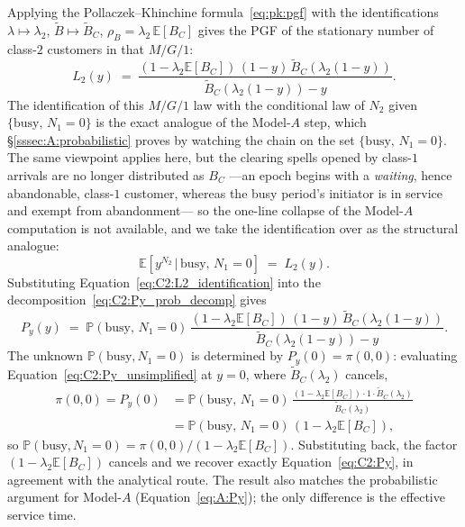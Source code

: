 Applying the Pollaczek--Khinchine formula~\eqref{eq:pk:pgf} with the identifications $\lambda\mapsto\lambda_2$, $\widetilde{B}\mapsto\widetilde{B}_C$, $\rho_B=\lambda_2\,\mathbb{E}[B_C]$ gives the PGF of the stationary number of class-$2$ customers in that $M/G/1$:
\begin{equation*}
    L_2(y) \;=\; \frac{(1 - \lambda_2 \mathbb{E}[B_C])\,(1-y)\,\widetilde{B}_C(\lambda_2(1-y))}{\widetilde{B}_C(\lambda_2(1-y)) - y}.
\end{equation*}
The identification of this $M/G/1$ law with the conditional law of $N_2$ given $\{\text{busy},\,N_1=0\}$ is the exact analogue of the Model-$A$ step, which \S\ref{sssec:A:probabilistic} proves by watching the chain on the set $\{\text{busy},\,N_1=0\}$. The same viewpoint applies here, but the clearing spells opened by class-$1$ arrivals are no longer distributed as $B_C$ ---an epoch begins with a \emph{waiting}, hence abandonable, class-$1$ customer, whereas the busy period's initiator is in service and exempt from abandonment--- so the one-line collapse of the Model-$A$ computation is not available, and we take the identification over as the structural analogue:
\begin{equation}
    \mathbb{E}\!\left[y^{N_2} \,\big|\, \text{busy},\, N_1=0\right] \;=\; L_2(y).
    \label{eq:C2:L2_identification}
\end{equation}
Substituting Equation~\eqref{eq:C2:L2_identification} into the decomposition~\eqref{eq:C2:Py_prob_decomp} gives
\begin{equation}
    P_y(y) \;=\; \mathbb{P}(\text{busy},\,N_1=0)\,\frac{(1-\lambda_2\mathbb{E}[B_C])\,(1-y)\,\widetilde{B}_C(\lambda_2(1-y))}{\widetilde{B}_C(\lambda_2(1-y)) - y}.
    \label{eq:C2:Py_unsimplified}
\end{equation}
The unknown $\mathbb{P}(\text{busy},N_1=0)$ is determined by $P_y(0)=\pi(0,0)$: evaluating Equation~\eqref{eq:C2:Py_unsimplified} at $y=0$, where $\widetilde{B}_C(\lambda_2)$ cancels,
\begin{align*}
    \pi(0,0)=P_y(0)
    &= \mathbb{P}(\text{busy},\,N_1=0)\,\frac{(1-\lambda_2\mathbb{E}[B_C])\cdot 1\cdot \widetilde{B}_C(\lambda_2)}{\widetilde{B}_C(\lambda_2)} \\
    &= \mathbb{P}(\text{busy},\,N_1=0)\,(1-\lambda_2\mathbb{E}[B_C]),
\end{align*}
so $\mathbb{P}(\text{busy},N_1=0)=\pi(0,0)/(1-\lambda_2\mathbb{E}[B_C])$. Substituting back, the factor $(1-\lambda_2\mathbb{E}[B_C])$ cancels and we recover exactly Equation~\eqref{eq:C2:Py}, in agreement with the analytical route. The result also matches the probabilistic argument for Model-$A$ (Equation~\eqref{eq:A:Py}); the only difference is the effective service time.

